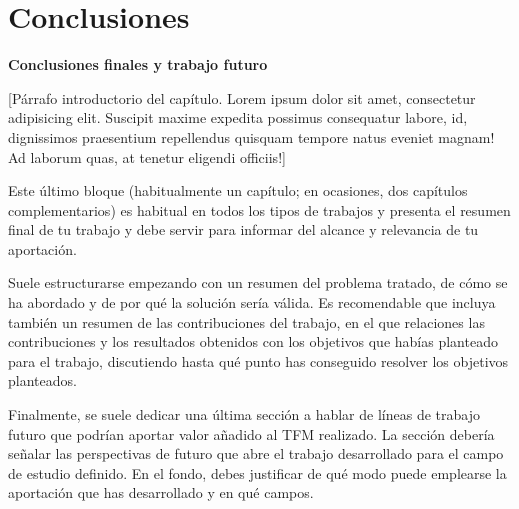 \chapter{Conclusiones}\label{chap:conclusiones}
\textbf{Conclusiones finales y trabajo futuro}

[Párrafo introductorio del capítulo. Lorem ipsum dolor sit amet, consectetur adipisicing elit. Suscipit maxime expedita possimus consequatur labore, id, dignissimos praesentium repellendus quisquam tempore natus eveniet magnam! Ad laborum quas, at tenetur eligendi officiis!]

Este último bloque (habitualmente un capítulo; en ocasiones, dos capítulos complementarios) es habitual en todos los tipos de trabajos y presenta el resumen final de tu trabajo y debe servir para informar del alcance y relevancia de tu aportación.\par

Suele estructurarse empezando con un resumen del problema tratado, de cómo se ha abordado y de por qué la solución sería válida.
Es recomendable que incluya también un resumen de las contribuciones del trabajo, en el que relaciones las contribuciones y los resultados obtenidos con los objetivos que habías planteado para el trabajo, discutiendo hasta qué punto has conseguido resolver los objetivos planteados.\par

Finalmente, se suele dedicar una última sección a hablar de líneas de trabajo futuro que podrían aportar valor añadido al TFM realizado. La sección debería señalar las perspectivas de futuro que abre el trabajo desarrollado para el campo de estudio definido. En el fondo, debes justificar de qué modo puede emplearse la aportación que has desarrollado y en qué campos.